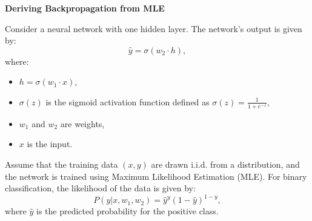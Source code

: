 \documentclass[12pt,letterpaper, onecolumn]{exam}
\begin{document}
\begin{questions}
\begin{solution}
\begin{parts}
        \part 
        \part 
        \part 
        \part 
    \end{parts}
\end{solution}


\question[10 points]\textbf{Deriving Backpropagation from MLE}\droppoints

Consider a neural network with one hidden layer. The network’s output is given by:
\[
\hat{y} = \sigma(w_2 \cdot h),
\]
where:
\begin{itemize}
    \item \( h = \sigma(w_1 \cdot x) \),
    \item \( \sigma(z) \) is the sigmoid activation function defined as \( \sigma(z) = \frac{1}{1 + e^{-z}} \),
    \item \( w_1 \) and \( w_2 \) are weights,
    \item \( x \) is the input.
\end{itemize}

Assume that the training data \((x, y)\) are drawn i.i.d. from a distribution, and the network is trained using Maximum Likelihood Estimation (MLE). For binary classification, the likelihood of the data is given by:
\[
P(y | x, w_1, w_2) = \hat{y}^y (1 - \hat{y})^{1-y},
\]
where \( \hat{y} \) is the predicted probability for the positive class.


\end{questions}
\end{document}

